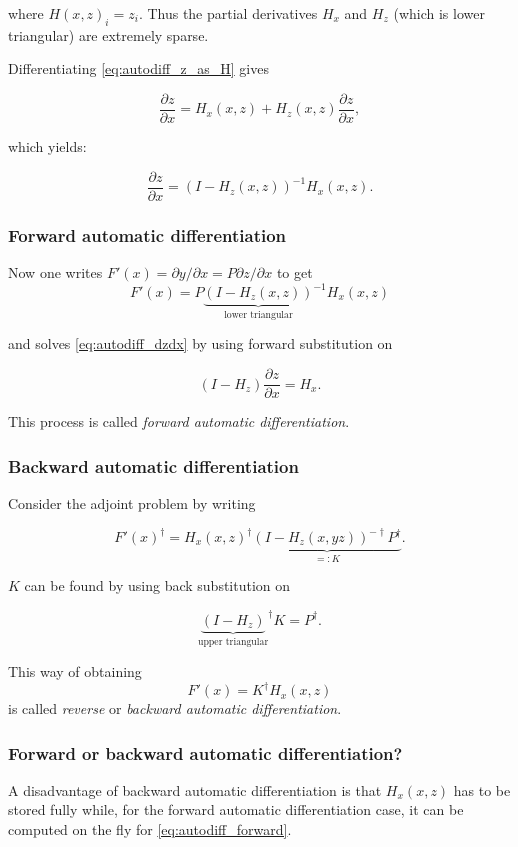 \documentclass[12pt]{article}
\theoremstyle{definition}\newtheorem*{definition}{Definition}
\theoremstyle{definition}\newtheorem*{remark}{Remark}
\begin{document}
 where $H(x,z)_i = z_i$. Thus the partial derivatives $H_x$ and $H_z$ (which is lower triangular) are extremely sparse.

Differentiating \eqref{eq:autodiff_z_as_H} gives

\begin{equation}\label{eq:autodiff_dzdx}
	\frac{\partial z}{\partial x} = H_x(x,z)+H_z(x,z)\frac{\partial z}{\partial x},
\end{equation}

which yields:

$$\frac{\partial z}{\partial x} = (I-H_z(x,z))^{-1}H_x(x,z).$$

\subsubsection{Forward automatic differentiation}

Now one writes $F'(x) = \partial y/\partial x = P\partial z/\partial x$ to get $$F'(x) = P{\underbrace{(I-H_z(x,z))}_{\text{lower triangular}}}^{-1}H_x(x,z)$$

and solves \eqref{eq:autodiff_dzdx} by using forward substitution on 

\begin{equation}\label{eq:autodiff_forward}
	(I-H_z)\frac{\partial z}{\partial x} = H_x.
\end{equation}

This process is called \textit{forward automatic differentiation}.

\subsubsection{Backward automatic differentiation}
Consider the adjoint problem by writing

$$F'(x)^\dagger = H_x(x,z)^\dagger\underbrace{(I-H_z(x,yz))^{-\dagger}P^\dagger}_{=:K}.$$

$K$ can be found by using back substitution on 

\begin{equation}\label{eq:autodiff_backward}
	{\underbrace{(I-H_z)}_{\text{upper triangular}}}^\dagger K=P^\dagger.
\end{equation}

This way of obtaining $$F'(x) = K^\dagger H_x(x,z)$$ is called \textit{reverse} or \textit{backward automatic differentiation}.

\subsubsection{Forward or backward automatic differentiation?}
A disadvantage of backward automatic differentiation is that $H_x(x,z)$ has to be stored fully while, for the forward automatic differentiation case, it can be computed on the fly for \eqref{eq:autodiff_forward}.
\end{document}
